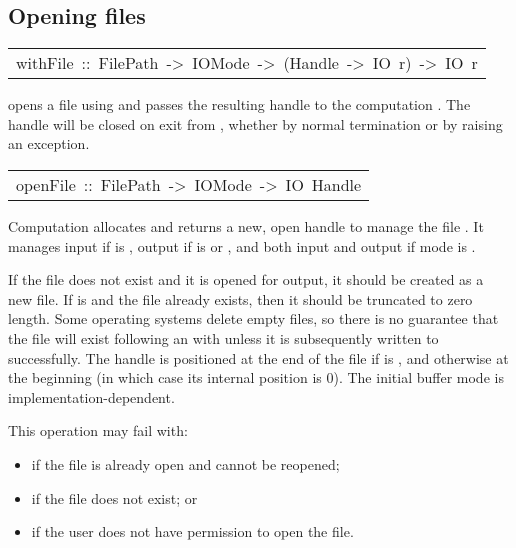 \subsection{Opening files
}
\begin{haddockdesc}
\item[\begin{tabular}{@{}l}
withFile\ ::\ FilePath\ ->\ IOMode\ ->\ (Handle\ ->\ IO\ r)\ ->\ IO\ r
\end{tabular}]\haddockbegindoc
{} opens a file using  and passes
 the resulting handle to the computation .  The handle will be
 closed on exit from , whether by normal termination or by
 raising an exception.
\par

\end{haddockdesc}
\begin{haddockdesc}
\item[\begin{tabular}{@{}l}
openFile\ ::\ FilePath\ ->\ IOMode\ ->\ IO\ Handle
\end{tabular}]\haddockbegindoc
Computation   allocates and returns a new, open
 handle to manage the file .  It manages input if 
 is , output if  is  or ,
 and both input and output if mode is .
\par
If the file does not exist and it is opened for output, it should be
 created as a new file.  If  is  and the file
 already exists, then it should be truncated to zero length.
 Some operating systems delete empty files, so there is no guarantee
 that the file will exist following an  with 
  unless it is subsequently written to successfully.
 The handle is positioned at the end of the file if  is
 , and otherwise at the beginning (in which case its
 internal position is 0).
 The initial buffer mode is implementation-dependent.
\par
This operation may fail with:
\par
\begin{itemize}
\item
  if the file is already open and cannot be reopened;
\par

\item
  if the file does not exist; or
\par

\item
  if the user does not have permission to open the file.
\par

\end{itemize}

\end{haddockdesc}
